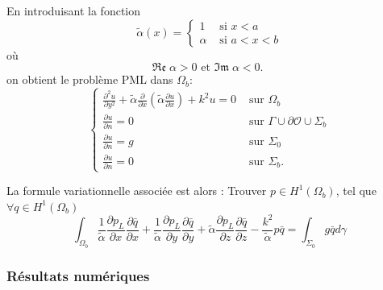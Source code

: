 \documentclass{article}
\begin{document}
En introduisant la fonction
$$
\tilde{\alpha}(x)= \begin{cases}1 & \text { si } x<a \\ \alpha & \text { si } a<x<b\end{cases}
$$
où 
$$
\mathfrak{Re } \; \alpha>0 \text { et } \mathfrak{Im } \;  \alpha<0 \text {. }
$$ on obtient  le problème PML dans $\displaystyle \Omega_b$:
$$
\displaystyle
\begin{cases}\displaystyle \frac{\partial^2 u}{\partial y^2}+\tilde{\alpha} \frac{\partial}{\partial x}\left(\tilde{\alpha} \frac{\partial u}{\partial x}\right)+k^2 u=0 & \text { sur } \Omega_b \\[0.4cm] \displaystyle\frac{\partial u}{\partial n}=0 & \text { sur } \Gamma \cup \partial \mathcal{O} \cup \Sigma_b \\[0.4cm] \displaystyle \frac{\partial u}{\partial n}=g & \text { sur } \Sigma_0 \\[0.4cm] \displaystyle \frac{\partial u}{\partial n}=0 & \text { sur } \Sigma_b .\end{cases}
$$


La formule variationnelle associée est alors : Trouver $p \in H^1\left(\Omega_b\right)$, tel que $\forall q \in H^1\left(\Omega_b\right)$ $$ \int_{\Omega_b} \frac{1}{\tilde{\alpha}} \frac{\partial p_L}{\partial x} \frac{\partial \bar{q}}{\partial x}+\frac{1}{\tilde{\alpha}} \frac{\partial p_L}{\partial y} \frac{\partial \bar{q}}{\partial y}+\tilde{\alpha} \frac{\partial p_L}{\partial z} \frac{\partial \bar{q}}{\partial z}-\frac{k^2}{\tilde{\alpha}} p \bar{q}=\int_{\Sigma_0} g \bar{q} d \gamma $$
\subsubsection{Résultats numériques}
\end{document}
